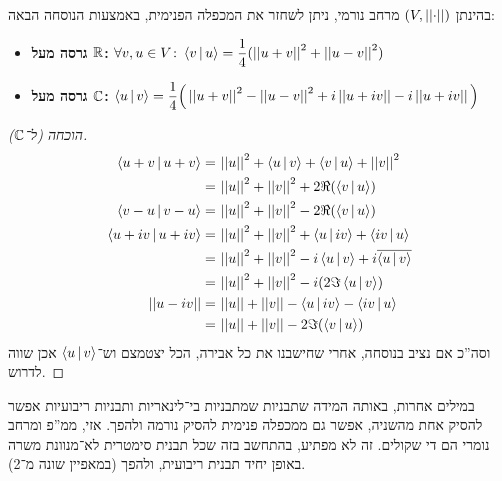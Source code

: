 \documentclass[name=רשימות אלגברה לינארית 2א]{../../../tex/classes/megasumPreamble}
\begin{document}
	
	\begin{Theorem}
		 בהינתן $(V, \snorm)$ מרחב נורמי, ניתן לשחזר את המכפלה הפנימית, באמצעות הנוסחה הבאה: 
		\begin{itemize}
			\item \textbf{גרסה מעל $\bm{\R}$: }\hfil $\disty \forall v, u \in V \co \mut{v}{u} = \frac{1}{4}(\norm{u + v}^2 + \norm{u - v}^2)$
			\item \textbf{גרסה מעל $\C$: }\hfil $\disty \mut{u}{v} = \frac{1}{4}\Big(\norm{u + v}^2 - \norm{u - v}^2 + i\norm{u + iv} - i\norm{u + iv}\Big)$
		\end{itemize}
	\end{Theorem}
	\begin{proof}[הוכחה (ל־$\bm{\C}$)]
		\begin{align*}
			\mut{u + v}{u + v} =\,& \norm{u}^2 + \mut{u}{v} + \mut{v}{u} + \norm{v}^2 \\
			=\,& \norm{u}^2 + \norm{v}^2 + 2\Re(\mut{v}{u}) \\
			\mut{v - u}{v - u} = \, & \norm{u}^2 + \norm{v}^2 - 2\Re(\mut{v}{u}) \\
			\mut{u + iv}{u + iv} =\,& \norm{u}^2 + \norm{v}^2 + \mut{u}{iv} + \mut{iv}{u}  \\
			=\,& \norm{u}^2 + \norm{v}^2 - i\mut{u}{v} + i\ol{\mut{u}{v}} \\
			=\,& \norm{u}^2 + \norm{v}^2 - i(2 \Im\mut{u}{v}) \\
			\norm{u - iv} =\,& \norm{u} + \norm{v} - \mut{u}{iv} - \mut{iv}{u} \\
			=\,& \norm{u} + \norm{v} - 2\Im(\mut{v}{u})
		\end{align*}
		וסה''כ אם נציב בנוסחה, אחרי שחישבנו את כל אבירה, הכל יצטמצם וש־$\mut{u}{v}$ אכן שווה לדרוש. 
	\end{proof}
	
	במילים אחרות, באותה המידה שתבניות שמתבניות בי־לינאריות ותבניות ריבועיות אפשר להסיק אחת מהשניה, אפשר גם ממכפלה פנימית להסיק נורמה ולהפך. אזי, ממ''פ ומרחב נומרי הם די שקולים. זה לא מפתיע, בהתחשב בזה שכל תבנית סימטרית לא־מנוונת משרה באופן יחיד תבנית ריבועית, ולהפך (במאפיין שונה מ־2). 
	
\end{document}
